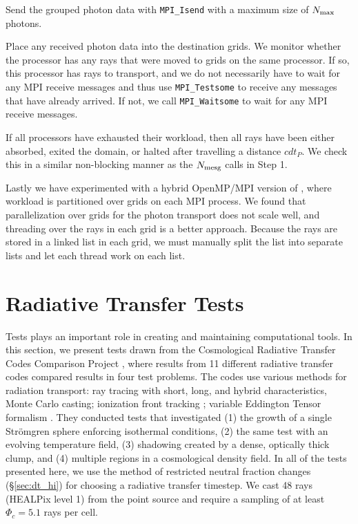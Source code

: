 \documentclass[useAMS,usenatbib]{mn2e}
\begin{document}
 Send the grouped photon data with \texttt{MPI\_Isend} with a
maximum size of $N_{\rm max}$ photons.

 Place any received photon data into the destination grids.
We monitor whether the processor has any rays that were moved to grids
on the same processor.  If so, this processor has rays to transport,
and we do not necessarily have to wait for any MPI receive messages
and thus use \texttt{MPI\_Testsome} to receive any messages that have
already arrived.  If not, we call \texttt{MPI\_Waitsome} to wait for
any MPI receive messages.

 If all processors have exhausted their workload, then all
rays have been either absorbed, exited the domain, or halted after
travelling a distance $cdt_P$.  We check this in a similar
non-blocking manner as the $N_{\rm mesg}$ calls in Step 1.

Lastly we have experimented with a hybrid OpenMP/MPI version of \enzo,
where workload is partitioned over grids on each MPI process.  We
found that parallelization over grids for the photon transport does
not scale well, and threading over the rays in each grid is a better
approach.  Because the rays are stored in a linked list in each grid,
we must manually split the list into separate lists and let each
thread work on each list.

\section{Radiative Transfer Tests}
\label{sec:rt_tests}

Tests plays an important role in creating and maintaining
computational tools.  In this section, we present tests drawn from the
Cosmological Radiative Transfer Codes Comparison Project \citep{RT06},
where results from 11 different radiative transfer codes compared
results in four test problems.  The codes use various methods for
radiation transport: ray tracing with short, long, and hybrid
characteristics, Monte Carlo casting; ionization front tracking
\citep{Alvarez06_IFT}; variable Eddington Tensor formalism
\citep{Gnedin01_OTVET}.  They conducted tests that investigated (1)
the growth of a single Str\"{o}mgren sphere enforcing isothermal
conditions, (2) the same test with an evolving temperature field, (3)
shadowing created by a dense, optically thick clump, and (4) multiple
\hii regions in a cosmological density field.  In all of the
tests presented here, we use the method of restricted neutral fraction
changes (\S\ref{sec:dt_hi}) for choosing a radiative transfer
timestep.  We cast 48 rays (HEALPix level 1) from the point source and
require a sampling of at least $\Phi_c = 5.1$ rays per cell.
\end{document}
